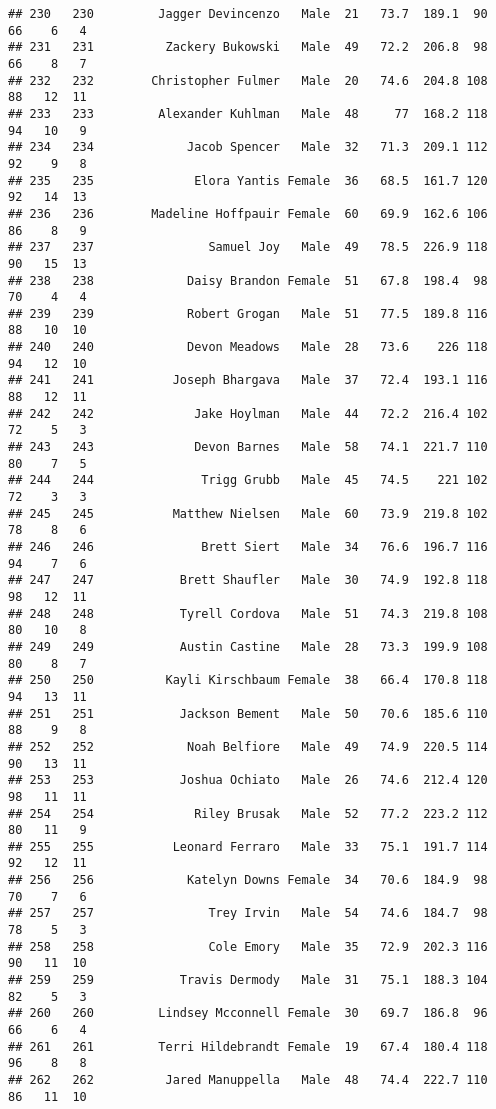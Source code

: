 \documentclass[
]{article}
\begin{document}
\begin{verbatim}
## 230   230         Jagger Devincenzo   Male  21   73.7  189.1  90  66    6   4
## 231   231          Zackery Bukowski   Male  49   72.2  206.8  98  66    8   7
## 232   232        Christopher Fulmer   Male  20   74.6  204.8 108  88   12  11
## 233   233         Alexander Kuhlman   Male  48     77  168.2 118  94   10   9
## 234   234             Jacob Spencer   Male  32   71.3  209.1 112  92    9   8
## 235   235              Elora Yantis Female  36   68.5  161.7 120  92   14  13
## 236   236        Madeline Hoffpauir Female  60   69.9  162.6 106  86    8   9
## 237   237                Samuel Joy   Male  49   78.5  226.9 118  90   15  13
## 238   238             Daisy Brandon Female  51   67.8  198.4  98  70    4   4
## 239   239             Robert Grogan   Male  51   77.5  189.8 116  88   10  10
## 240   240             Devon Meadows   Male  28   73.6    226 118  94   12  10
## 241   241           Joseph Bhargava   Male  37   72.4  193.1 116  88   12  11
## 242   242              Jake Hoylman   Male  44   72.2  216.4 102  72    5   3
## 243   243              Devon Barnes   Male  58   74.1  221.7 110  80    7   5
## 244   244               Trigg Grubb   Male  45   74.5    221 102  72    3   3
## 245   245           Matthew Nielsen   Male  60   73.9  219.8 102  78    8   6
## 246   246               Brett Siert   Male  34   76.6  196.7 116  94    7   6
## 247   247            Brett Shaufler   Male  30   74.9  192.8 118  98   12  11
## 248   248            Tyrell Cordova   Male  51   74.3  219.8 108  80   10   8
## 249   249            Austin Castine   Male  28   73.3  199.9 108  80    8   7
## 250   250          Kayli Kirschbaum Female  38   66.4  170.8 118  94   13  11
## 251   251            Jackson Bement   Male  50   70.6  185.6 110  88    9   8
## 252   252             Noah Belfiore   Male  49   74.9  220.5 114  90   13  11
## 253   253            Joshua Ochiato   Male  26   74.6  212.4 120  98   11  11
## 254   254              Riley Brusak   Male  52   77.2  223.2 112  80   11   9
## 255   255           Leonard Ferraro   Male  33   75.1  191.7 114  92   12  11
## 256   256             Katelyn Downs Female  34   70.6  184.9  98  70    7   6
## 257   257                Trey Irvin   Male  54   74.6  184.7  98  78    5   3
## 258   258                Cole Emory   Male  35   72.9  202.3 116  90   11  10
## 259   259            Travis Dermody   Male  31   75.1  188.3 104  82    5   3
## 260   260         Lindsey Mcconnell Female  30   69.7  186.8  96  66    6   4
## 261   261         Terri Hildebrandt Female  19   67.4  180.4 118  96    8   8
## 262   262          Jared Manuppella   Male  48   74.4  222.7 110  86   11  10

\end{verbatim}
\end{document}
